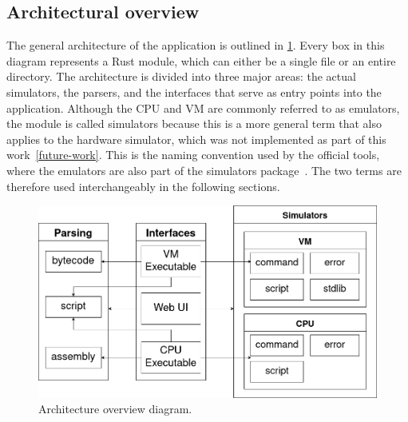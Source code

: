 
\subsection{Architectural overview}
The general architecture of the application is outlined in \cref{fig:arch}.
Every box in this diagram represents a Rust module, which can either be a single file or an entire directory.
The architecture is divided into three major areas: the actual simulators, the parsers, and the interfaces that serve as entry points into the application.
Although the CPU and VM are commonly referred to as emulators, the module is called simulators because this is a more general term that also applies to the hardware simulator, which was not implemented as part of this work~\ref{future-work}.
This is the naming convention used by the official tools, where the emulators are also part of the simulators package~\cite{n2tsimulators}.
The two terms are therefore used interchangeably in the following sections.

\begin{center}
  \begin{figure}[ht]
    \centering
    \includegraphics[width=12cm]{fig/architecture.png}
    \caption{Architecture overview diagram.}%
    \label{fig:arch}
  \end{figure}
\end{center}

